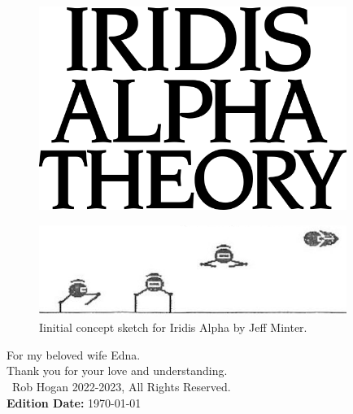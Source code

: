
\vspace*{\fill}
\begin{figure}[H]
    \centering
      \includegraphics[width=10cm]{src/cover/title_page.png}%
\end{figure}
\vspace*{\fill}
\thispagestyle{empty}%

\clearpage
\vspace*{\fill}
\begin{figure}[H]
    \centering
      \includegraphics[width=10cm]{src/bumph/sketch.png}%
\caption*{Iinitial concept sketch for Iridis Alpha by Jeff Minter.}
\end{figure}

\vspace*{\fill}
For my beloved wife Edna.\\
Thank you for your love and understanding.\\
\bigskip
\vspace*{\fill}
\textcopyright\ Rob Hogan 2022-2023, All Rights Reserved. \\
\textbf{Edition Date:} \today

\doclicenseThis
\thispagestyle{empty}%
\clearpage

